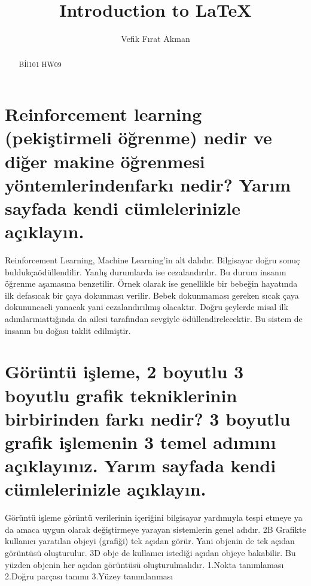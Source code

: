 \documentclass[12pt]{article}
\begin{document}
\title{Introduction to \LaTeX{}}
\author{Vefik Fırat Akman}

\maketitle

\begin{abstract}
Bİl101 HW09
\end{abstract}

\section{Reinforcement learning (pekiştirmeli öğrenme) nedir ve diğer makine
öğrenmesi yöntemlerindenfarkı nedir? Yarım sayfada kendi cümlelerinizle açıklayın.}
Reinforcement Learning, Machine Learning’in alt dalıdır. Bilgisayar doğru 
sonuç buldukçaödüllendilir. Yanlış durumlarda ise cezalandırılır.
Bu durum insanın öğrenme aşamasına benzetilir. Örnek olarak ise genellikle 
bir bebeğin hayatında ilk defasıcak bir çaya dokunması verilir. Bebek dokunmaması 
gereken sıcak çaya dokununcaeli yanacak yani cezalandırılmış olacaktır. 
Doğru şeylerde misal ilk adımlarınıattığında da ailesi tarafından sevgiyle
ödüllendirelecektir. Bu sistem de insanın bu doğası taklit edilmiştir.

\section{ Görüntü işleme, 2 boyutlu 3 boyutlu grafik tekniklerinin birbirinden
farkı nedir? 3 boyutlu grafik işlemenin 3 temel adımını açıklayınız. Yarım sayfada
kendi cümlelerinizle açıklayın.}
Görüntü işleme görüntü verilerinin içeriğini bilgisayar yardımıyla tespi etmeye
ya da amaca uygun olarak değiştirmeye yarayan sistemlerin genel adıdır.
2B Grafikte kullanıcı yaratılan objeyi (grafiği) tek açıdan görür. Yani objenin
de tek açıdan görüntüsü oluşturulur. 3D obje de kullanıcı istediği açıdan
objeye bakabilir. Bu yüzden objenin her açıdan görüntüsü oluşturulmalıdır.
1.Nokta tanımlaması
2.Doğru parçası tanımı
3.Yüzey tanımlanması
\end{document}

